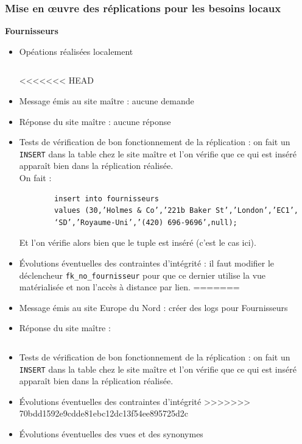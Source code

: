 \documentclass[10pt,a4paper]{article}
\theoremstyle{plain}
\begin{document}
\subsubsection{Mise en \oe uvre des réplications pour les besoins locaux}
\textbf{Fournisseurs}
\begin{itemize}
    \item Opéations réalisées localement
    \inputminted{sql}{EUS_V-A-5-a1.sql}
<<<<<<< HEAD
    \item Message émis au site maître : aucune demande
    \item Réponse du site maître : aucune réponse
    \item Tests de vérification de bon fonctionnement de la réplication : on fait un \verb|INSERT| dans la table chez le site maître et l'on vérifie que ce qui est inséré apparaît bien dans la réplication réalisée.\\
    On fait : 
    \begin{verbatim}
    	insert into fournisseurs
    	values (30,’Holmes & Co’,’221b Baker St’,’London’,’EC1’,
    	‘SD’,’Royaume-Uni’,’(420) 696-9696’,null);
    \end{verbatim}
   	Et l'on vérifie alors bien que le tuple est inséré (c'est le cas ici).
    
    \item Évolutions éventuelles des contraintes d'intégrité : il faut modifier le déclencheur \verb|fk_no_fournisseur| pour que ce dernier utilise la vue matérialisée et non l'accès à distance par lien.
=======
    \item Message émis au site Europe du Nord : créer des logs pour Fournisseurs 
    \item Réponse du site maître :
\inputminted{sql}{INSA-DB12-EuropeNord-rep-eu-n.sql}
    \item Tests de vérification de bon fonctionnement de la réplication : on fait un \verb|INSERT| dans la table chez le site maître et l'on vérifie que ce qui est inséré apparaît bien dans la réplication réalisée.
    \item Évolutions éventuelles des contraintes d'intégrité
>>>>>>> 70bdd1592e9cdde81ebc12dc13f54ee895725d2c
    \item Évolutions éventuelles des vues et des synonymes
\end{itemize}
\end{document}
